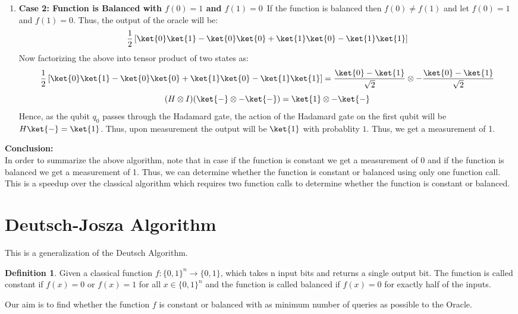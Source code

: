 \documentclass[12pt, oneside]{book}
\theoremstyle{definition}
\newtheorem{definition}{Definition}[section]
\theoremstyle{definition}
\theoremstyle{remark}
\begin{document}
\begin{enumerate}
    \item \textbf{Case 2: Function is Balanced with $f(0)=1$ and $f(1)=0$}\
    If the function is balanced then $f(0)\neq f(1)$ and let $f(0)=1$ and $f(1)=0$. Thus, the output of the oracle will be:
    \[
        \frac{1}{2}\left[\ket{0}\ket{1}-\ket{0}\ket{0}+\ket{1}\ket{0}-\ket{1}\ket{1}\right]
    \]
    Now factorizing the above into tensor product of two states as:
    \[
        \frac{1}{2}\left[\ket{0}\ket{1}-\ket{0}\ket{0}+\ket{1}\ket{0}-\ket{1}\ket{1}\right]=\frac{\ket{0}-\ket{1}}{\sqrt{2}}\otimes -\frac{\ket{0}-\ket{1}}{\sqrt{2}}
    \]
    \[
        (H\otimes I)(\ket{-} \otimes -\ket{-})=\ket{1}\otimes -\ket{-}
    \]
    Hence, as the qubit $q_0$ passes through the Hadamard gate, the action of the Hadamard gate on the first qubit will be $H\ket{-}=\ket{1}$.
    Thus, upon measurement the output will be $\ket{1}$ with probablity $1$. Thus, we get a measurement of 1.
\end{enumerate}
\textbf{Conclusion: }\\
In order to summarize the above algorithm, note that in case if the function is constant we get a measurement of 0 and if the function is balanced we get a measurement of 1. Thus, we can determine whether the function is constant or balanced using only one function call. This is a speedup over the classical algorithm which requires two function calls to determine whether the function is constant or balanced.

\section{Deutsch-Josza Algorithm}
This is a generalization of the Deutsch Algorithm.
\begin{definition}
    Given a classical function $f:\{0,1\}^n \rightarrow \{0,1\}$, which takes n input bits and returns a single output bit.
    The function is called constant if $f(x)=0$ or $f(x)=1$ for all $x \in \{0,1\}^n$ and the function is called balanced if $f(x)=0$ for exactly half of the inputs.
\end{definition}

Our aim is to find whether the function $f$ is constant or balanced with as minimum number of queries as possible to the Oracle.
\end{document}
